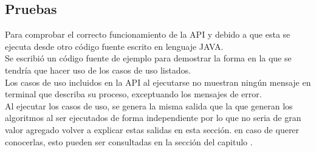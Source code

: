 \subsection{Pruebas}

Para comprobar el correcto funcionamiento de la API y debido a que esta se ejecuta desde otro código fuente escrito en lenguaje JAVA. 
\\
Se escribió un código fuente de ejemplo para demostrar la forma en la que se tendría que hacer uso de los casos de uso listados.\\
Los casos de uso incluidos en la API al ejecutarse no muestran ningún mensaje en terminal que describa su proceso, exceptuando los mensajes de error.\\
Al ejecutar los casos de uso, se genera la misma salida que la que generan los algoritmos al ser ejecutados de forma independiente por lo que no seria de gran valor agregado volver a explicar estas salidas en esta sección. en caso de querer conocerlas, esto pueden ser consultadas en la sección  del capitulo .\\
